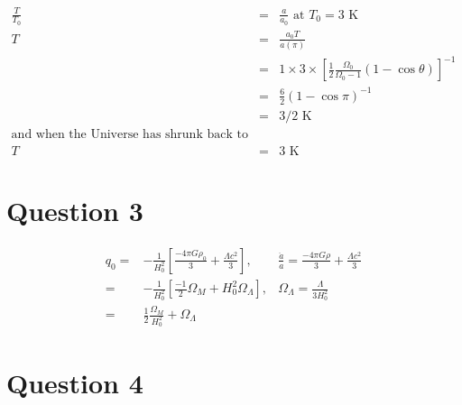 \documentclass[10pt,a4paper]{article}
\begin{document}
\begin{eqnarray*}
	\frac{T}{T_{0}} &=& \frac{a}{a_{0}} \mbox{ at $T_{0} = 3$ K} \\
	T &=& \frac{a_{0}T}{a(\pi)} \\
	  &=& 1 \times 3 \times [\frac{1}{2}\frac{\Omega_{0}}{\Omega_{0} -1} (1 - \cos \theta)]^{-1} \\
	  &=& \frac{6}{2}(1 - \cos \pi)^{-1} \\
	  &=& 3/2 \mbox{ K}\\
	  \mbox{and when the Universe has shrunk back to its present size:} \\
	  T &=& 3 \mbox{ K}
\end{eqnarray*}

\section*{Question 3}
\begin{eqnarray*}
	q_{0} =& -\frac{1}{H_{0}^{2}}[\frac{-4\pi G \rho_{0}}{3} + \frac{\Lambda c^{2}}{3}], &\frac{\ddot a}{a} = \frac{-4\pi G \rho}{3} + \frac{\Lambda c^{2}}{3} \\
	=& -\frac{1}{H_{0}^{2}}[\frac{-1}{2}\Omega_{M} + H_{0}^{2}\Omega_{\Lambda}], &\Omega_{\Lambda} = \frac{\Lambda}{3H_{0}^{2}} \\
	=& \frac{1}{2}\frac{\Omega_{M}}{H_{0}^{2}} + \Omega_{\Lambda} &
\end{eqnarray*}
\section*{Question 4}
\end{document}
